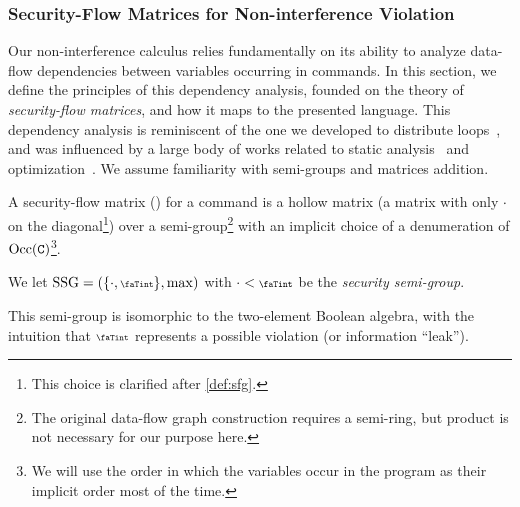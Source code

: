 \subsubsection{Security-Flow Matrices for Non-interference Violation}
\label{subsec:sfg}

Our non-interference calculus relies fundamentally on its ability to analyze data-flow dependencies between variables occurring in commands.
In this section, we define the principles of this dependency analysis, founded on the theory of \emph{security-flow matrices}, and how it maps to the presented language.
This dependency analysis is reminiscent of the one we developed to distribute loops~\cite{Aubert2023a}, and was influenced by a large body of works related to static analysis~\cite{Abel20002,Kristiansen2005b,Lee2001,Aubert2022b,Jones2009} and optimization~\cite{Moyen2017}.
We assume %
familiarity with semi-groups and matrices addition. %

A security-flow matrix (\SFM) for a %
command %
is a hollow matrix (\ie a matrix with only $\cdot$ on the diagonal\footnote{This choice is clarified after \autoref{def:sfg}.}) over a semi-group\footnote{The original data-flow graph construction requires a semi-ring, but product is not necessary for our purpose here.} with an implicit choice of a denumeration of \(\operatorname{Occ}(\mathtt{C})\)\footnote{We will use the order in which the variables occur in the program as their implicit order most of the time.\label{footnote:order-variables}}.

\begin{definition}
    We let \(\SSG=(\{\nv, \vi\}, \max)\) with \(\nv < \vi\) be the \emph{security semi-group}.
\end{definition}

This semi-group is isomorphic to the two-element Boolean algebra, with the intuition that \(\vi\) represents a possible violation (or information \enquote{leak}).

